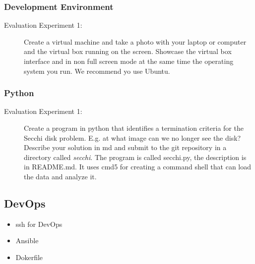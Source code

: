 \begin{itemize}
\subsubsection{Development Environment}


\begin{description}
\item[Evaluation Experiment 1:] Create a virtual machine and take a
  photo with your laptop or computer and the virtual box running on
  the screen. Showcase the virtual box interface and in non full
  screen mode at the same time the operating system you run. We
  recommend yo use Ubuntu.
\end{description}

\subsubsection{Python}



\begin{description}
\item[Evaluation Experiment 1:] Create a program in python that
  identifies a termination criteria for the Secchi disk
  problem. E.g. at what image can we no longer see the disk?
  Describe your solution in md and submit to the git repository in a
  directory called {\em secchi}. The program is called secchi.py, the
  description is in README.md. It uses cmd5 for creating a command
  shell that can load the data and analyze it. 
\end{description}

\subsection{DevOps}

\begin{itemize}
\item ssh for DevOps
\item Ansible
\item Dokerfile
\end{itemize}


\end{itemize}
